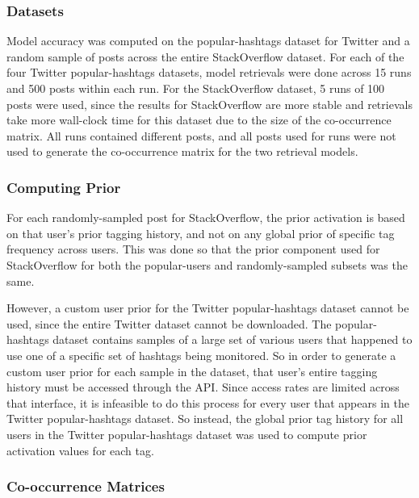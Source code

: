 \documentclass[man,floatsintext,donotrepeattitle]{apa6}
\begin{document}
\subsubsection{Datasets}

Model accuracy was computed on the popular-hashtags dataset for Twitter and a random sample of posts across the entire StackOverflow dataset.
For each of the four Twitter popular-hashtags datasets, model retrievals were done across 15 runs and 500 posts within each run.
For the StackOverflow dataset, 5 runs of 100 posts were used, since the results for StackOverflow are more stable and retrievals take more wall-clock time for this dataset due to the size of the co-occurrence matrix.
All runs contained different posts, and all posts used for runs were not used to generate the co-occurrence matrix for the two retrieval models.

\subsubsection{Computing Prior}

For each randomly-sampled post for StackOverflow, the prior activation is based on that user's prior tagging history, and not on any global prior of specific tag frequency across users.
This was done so that the prior component used for StackOverflow for both the popular-users and randomly-sampled subsets was the same.

However, a custom user prior for the Twitter popular-hashtags dataset cannot be used, since the entire Twitter dataset cannot be downloaded.
The popular-hashtags dataset contains samples of a large set of various users that happened to use one of a specific set of hashtags being monitored.
So in order to generate a custom user prior for each sample in the dataset, that user's entire tagging history must be accessed through the API.
Since access rates are limited across that interface, it is infeasible to do this process for every user that appears in the Twitter popular-hashtags dataset.
So instead, the global prior tag history for all users in the Twitter popular-hashtags dataset was used to compute prior activation values for each tag.

\subsubsection{Co-occurrence Matrices}
\end{document}
